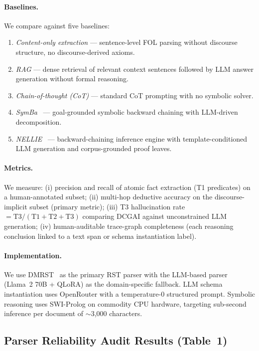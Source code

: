 \documentclass[11pt,letterpaper]{article}
\begin{document}
\paragraph{Baselines.}
We compare against five baselines:
\begin{enumerate}
  \item \textit{Content-only extraction} --- sentence-level FOL parsing without discourse structure, no
    discourse-derived axioms.
  \item \textit{RAG} --- dense retrieval of relevant context sentences followed by LLM answer generation without
    formal reasoning.
  \item \textit{Chain-of-thought (CoT)} --- standard CoT prompting with no symbolic solver.
  \item \textit{SymBa}~\citep{Lee2024} --- goal-grounded symbolic backward chaining with LLM-driven decomposition.
  \item \textit{NELLIE}~\citep{Weir2024} --- backward-chaining inference engine with template-conditioned LLM
    generation and corpus-grounded proof leaves.
\end{enumerate}

\paragraph{Metrics.}
We measure: (i) precision and recall of atomic fact extraction (T1 predicates) on a human-annotated subset;
(ii) multi-hop deductive accuracy on the discourse-implicit subset (primary metric); (iii) T3 hallucination rate
$= \text{T3}/(\text{T1}+\text{T2}+\text{T3})$ comparing DCGAI against unconstrained LLM generation; (iv)
human-auditable trace-graph completeness (each reasoning conclusion linked to a text span or schema instantiation
label).

\paragraph{Implementation.}
We use DMRST~\citep{Liu2021} as the primary RST parser with the \citet{Maekawa2024} LLM-based parser (Llama~2 70B +
QLoRA) as the domain-specific fallback. LLM schema instantiation uses OpenRouter with a temperature-0 structured
prompt. Symbolic reasoning uses SWI-Prolog on commodity CPU hardware, targeting sub-second inference per document of
$\sim$3,000 characters.

\subsection{Parser Reliability Audit Results (Table~1)}
\label{sec:audit-results}
\end{document}
